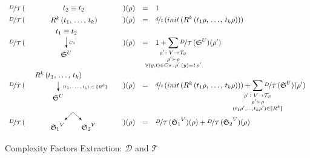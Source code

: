 \begin{figure}[t]
\[
\begin{array}{rclcl}
 \mathcal{\nicefrac{D}{T}}\,(&\parbox[m]{1.3cm}{\schemenode{$\unigoal{t_2}{t_2}$}}&)(\rho) &=& 1  \\

 \mathcal{\nicefrac{D}{T}}\,(&\parbox[m]{2.5cm}{\schemenode{$\invokegoal{R^k}{t_1}{t_k}$}}&)(\rho) &=& \nicefrac{d}{t}\,(init\,(\invokegoal{R^k}{t_1 \rho}{t_k \rho})) \\

 \mathcal{\nicefrac{D}{T}}\,(&\parbox[m]{2cm}{\schemesarrow{$\unigoal{t_1}{t_2}$}{$Cs$}{$\schemewithvset{\mathfrak{S}}{U}$}} &)(\rho) &=& 1 +
      \smashoperator{\sum\limits_{\substack{ \rho' \colon V \to \grterms \\
                                      \rho' \succ \rho \\
                                      \forall (y, t) \in Cs\,:\, \rho'\,(y) = t\, \rho'  }}}
           \mathcal{\nicefrac{D}{T}}\,(\schemewithvset{\mathfrak{S}}{U})(\rho')  \\

 \mathcal{\nicefrac{D}{T}}\,(& \parbox[m]{4cm}{\schemedarrow{$\invokegoal{R^k}{t_1}{t_k}$}{ $(t_1, \dots, t_k) \in \sembr{R^k}  $}{$\schemewithvset{\mathfrak{S}}{U}$}} &)(\rho) &=&
      \nicefrac{d}{t}\,(init\,(\invokegoal{R^k}{t_1 \rho}{t_k \rho})) +
      \smashoperator{\sum\limits_{\substack{ \rho' \colon V \to \grterms \\
                                      \rho' \succ \rho \\
                                      (t_1 \rho', \dots, t_k \rho') \in \sembr{R^k}  }}}
           \mathcal{\nicefrac{D}{T}}\,(\schemewithvset{\mathfrak{S}}{U})(\rho')  \\

 \mathcal{\nicefrac{D}{T}}\,(&\parbox[m]{2.5cm}{\schemefork{$\schemewithvset{\mathfrak{S}_1}{V}$}{$\schemewithvset{\mathfrak{S}_2}{V}$}}&)(\rho) &=&
 \mathcal{\nicefrac{D}{T}}\,(\schemewithvset{\mathfrak{S}_1}{V})(\rho) + \mathcal{\nicefrac{D}{T}}\,(\schemewithvset{\mathfrak{S}_2}{V})(\rho)
\end{array}
\]
\caption{Complexity Factors Extraction: $\mathcal D$ and $\mathcal T$}
\label{fig:scheduling_extraction_d_t}
\end{figure}

